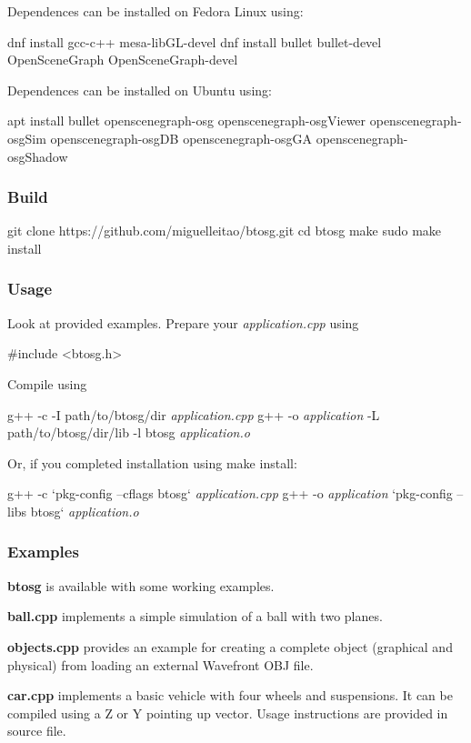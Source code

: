 Dependences can be installed on Fedora Linux using\+: \begin{DoxyVerb}dnf install gcc-c++ mesa-libGL-devel
dnf install bullet bullet-devel OpenSceneGraph OpenSceneGraph-devel
\end{DoxyVerb}


Dependences can be installed on Ubuntu using\+: \begin{DoxyVerb}apt install bullet openscenegraph-osg openscenegraph-osgViewer openscenegraph-osgSim openscenegraph-osgDB openscenegraph-osgGA openscenegraph-osgShadow
\end{DoxyVerb}


\subsubsection*{Build}

\begin{DoxyVerb}git clone https://github.com/miguelleitao/btosg.git
cd btosg
make
sudo make install
\end{DoxyVerb}


\subsubsection*{Usage}

Look at provided examples. Prepare your {\itshape application.\+cpp} using \begin{DoxyVerb}#include <btosg.h>
\end{DoxyVerb}


Compile using


\begin{DoxyPre}
g++ -c -I path/to/btosg/dir {\itshape application.cpp}
g++ -o {\itshape application} -L path/to/btosg/dir/lib -l btosg {\itshape application.o}
\end{DoxyPre}


Or, if you completed installation using {\ttfamily make install}\+:


\begin{DoxyPre}
g++ -c `pkg-config --cflags btosg` {\itshape application.cpp}
g++ -o {\itshape application} `pkg-config --libs btosg` {\itshape application.o}
\end{DoxyPre}


\subsubsection*{Examples}

{\bfseries{btosg}} is available with some working examples.
\begin{DoxyItemize}
\item {\bfseries{ball.\+cpp}} implements a simple simulation of a ball with two planes.
\item {\bfseries{objects.\+cpp}} provides an example for creating a complete object (graphical and physical) from loading an external Wavefront O\+BJ file.
\item {\bfseries{car.\+cpp}} implements a basic vehicle with four wheels and suspensions. It can be compiled using a Z or Y pointing up vector. Usage instructions are provided in source file.
\end{DoxyItemize}

